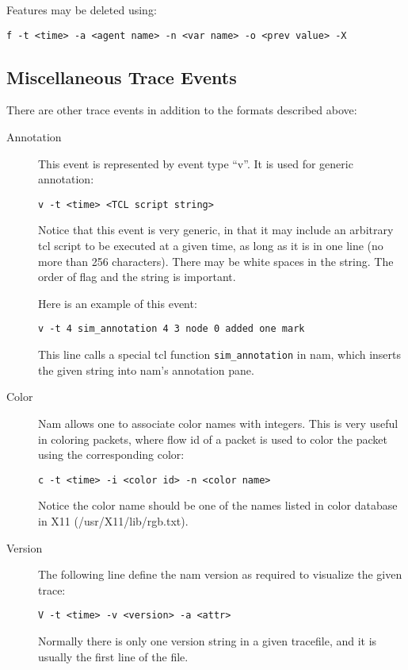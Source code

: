 Features may be deleted using:
\begin{verbatim}
f -t <time> -a <agent name> -n <var name> -o <prev value> -X
\end{verbatim}

\subsection{Miscellaneous Trace Events}

There are other trace events in addition to the formats described above:
\begin{description}
\item[Annotation] This event is represented by event type ``v''. 
  It is used for generic annotation:
\begin{verbatim}
v -t <time> <TCL script string>  
\end{verbatim}
  Notice that this event is very generic, in that it may include an
  arbitrary tcl script to be executed at a given
  time, as long as it is in one line (no more than 256
  characters).
  There may be white spaces in the string.
  The order of flag and the string is important.

  Here is an example of this event:
\begin{verbatim}
v -t 4 sim_annotation 4 3 node 0 added one mark
\end{verbatim}
  This line calls a special tcl function {\tt sim\_annotation} in
  nam, which inserts the given string 
  into nam's annotation pane.

\item[Color] Nam allows one to associate color names with
  integers. This is very useful in coloring packets, where flow id of
  a packet is used to color the packet using the corresponding color:
\begin{verbatim}
c -t <time> -i <color id> -n <color name>
\end{verbatim}
  Notice the color name should be one of the names
  listed in color database in X11 (/usr/X11/lib/rgb.txt). 

\item[Version]
  The following line define the nam version as required to visualize
  the given trace:
\begin{verbatim}
V -t <time> -v <version> -a <attr>
\end{verbatim}
  Normally there is only one version string in a given tracefile, and
  it is usually the first line of the file.


\end{description}
